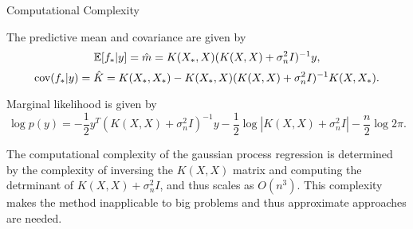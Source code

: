 \begin{frame}{Computational Complexity}
	
	The predictive mean and covariance are given by
	$$\mathbb{E}[f_* | y] = \hat m = K(X_*, X) (K(X, X) + \sigma_n^2 I)^{-1} y,$$
	$$\mbox{cov}(f_* | y ) = \hat K = K(X_*, X_*) - K(X_*, X)(K(X, X) + \sigma_n^2 I)^{-1}K(X, X_*).$$

	Marginal likelihood is given by
	$$\log p(y) = -\frac 1 2 y^{T} (K(X, X) + \sigma_n^2 I)^{-1} y - \frac 1 2 \log |K(X, X) + \sigma_n^2 I| - \frac n 2 \log 2 \pi.$$

	The computational complexity of the gaussian process regression is determined by the complexity of inversing the $K(X, X)$ matrix and computing the detrminant of $K(X, X) + \sigma_n^2 I$, and thus scales as $O(n^3)$. This complexity makes the method inapplicable to big problems and thus approximate approaches are needed.
\end{frame}
